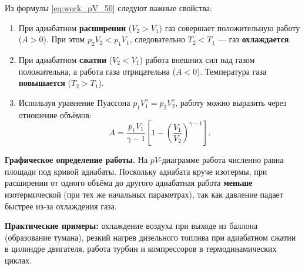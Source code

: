\begin{property}
Из формулы \eqref{eq:work_pV_50} следуют важные свойства:
\begin{enumerate}
    \item При адиабатном \textbf{расширении} ($V_2 > V_1$) газ совершает положительную работу ($A > 0$). При этом $p_2 V_2 < p_1 V_1$, следовательно $T_2 < T_1$ --- газ \textbf{охлаждается}.
    \item При адиабатном \textbf{сжатии} ($V_2 < V_1$) работа внешних сил над газом положительна, а работа газа отрицательна ($A < 0$). Температура газа \textbf{повышается} ($T_2 > T_1$).
    \item Используя уравнение Пуассона $p_1 V_1^\gamma = p_2 V_2^\gamma$, работу можно выразить через отношение объёмов:
    \begin{equation}
        A = \frac{p_1 V_1}{\gamma - 1} \left[ 1 - \left(\frac{V_1}{V_2}\right)^{\gamma - 1} \right].
    \end{equation}
\end{enumerate}
\end{property}

\begin{remark}
\textbf{Графическое определение работы.} На $pV$-диаграмме работа численно равна площади под кривой адиабаты. Поскольку адиабата круче изотермы, при расширении от одного объёма до другого адиабатная работа \textbf{меньше} изотермической (при тех же начальных параметрах), так как давление падает быстрее из-за охлаждения газа.
\par\noindent\textbf{Практические примеры:} охлаждение воздуха при выходе из баллона (образование тумана), резкий нагрев дизельного топлива при адиабатном сжатии в цилиндре двигателя, работа турбин и компрессоров в термодинамических циклах.
\end{remark}

